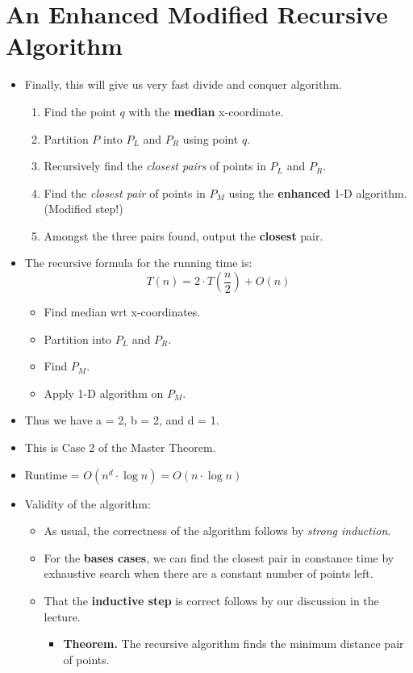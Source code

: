 \documentclass[12pt]{article}
\begin{document}
\section{An Enhanced Modified Recursive Algorithm}
\renewcommand{\labelitemii}{$\circ$}
\renewcommand{\labelitemiii}{$\cdot$}
\renewcommand{\labelitemiii}{$\rightarrow$}
\renewcommand{\labelitemiv}{$\star$}	
\begin{itemize}
\item Finally, this will give us very fast divide and conquer algorithm.
	\begin{enumerate}
	\item Find the point $q$ with the \textbf{median} x-coordinate.
	\item Partition $P$ into $P_L$ and $P_R$ using point $q$.
	\item Recursively find the \textit{closest pairs} of points in $P_L$ and $P_R$.
	\item Find the \textit{closest pair} of points in $P_M$ using the \textbf{enhanced} 1-D algorithm. (Modified step!)
	\item Amongst the three pairs found, output the \textbf{closest} pair.
	\end{enumerate}
\item The recursive formula for the running time is:
	 {\large $$T(n) = 2 \cdot T(\frac{n}{2}) + O(n) $$}
	 \begin{itemize}
	\item Find median wrt x-coordinates.
	\item Partition into $P_L$ and $P_R$.
	\item Find $P_M$.
	\item Apply 1-D algorithm on $P_M$.
	\end{itemize} 
\item Thus we have a = 2, b = 2, and d = 1.
\item This is Case 2 of the Master Theorem.
\item Runtime = $O(n^d \cdot \log{}n) = O(n \cdot \log{}n)$
\item Validity of the algorithm:
	\begin{itemize}
	\item As usual, the correctness of the algorithm follows by \textit{strong induction}.
	\item For the \textbf{bases cases}, we can find the closest pair in constance time by exhaustive search when there are a constant number of points left.
	\item That the \textbf{inductive step} is correct follows by our discussion in the lecture.
		\begin{itemize}
		\item \textbf{Theorem.} The recursive algorithm finds the minimum distance pair of points.
		\end{itemize} 
	\end{itemize} 
\end{itemize}
	
\end{document}
